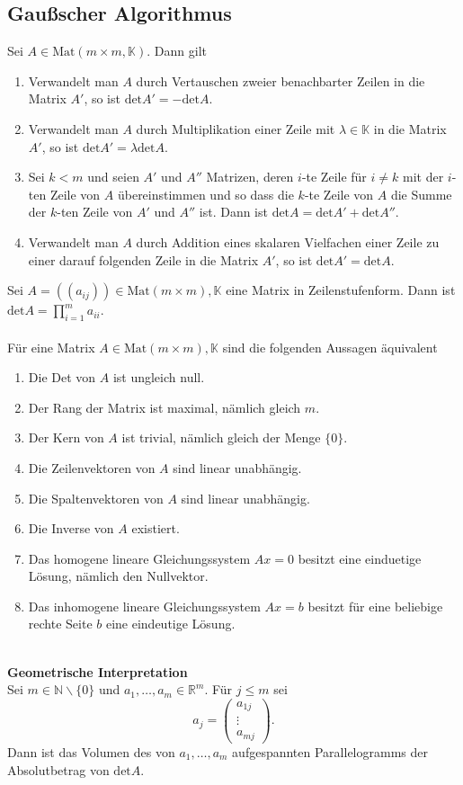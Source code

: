 \documentclass[a4paper,12pt]{article}
\numberwithin{equation}{section}
\begin{document}
\subsection{Gaußscher Algorithmus}
Sei $A \in \text{Mat}\left(m\times m,\mathbb{K}\right)$. Dann gilt
\begin{enumerate}[label=(\alph*)]
        \item Verwandelt man $A$ durch Vertauschen zweier benachbarter Zeilen in die Matrix $A'$, so ist $\text{det}A'=-\text{det}A$. 
        \item Verwandelt man $A$ durch Multiplikation einer Zeile mit $\lambda  \in \mathbb{K}$ in die Matrix $A'$, so ist $\text{det}A'=\lambda \text{det}A$.
        \item Sei $k<m$ und seien $A'$ und $A''$ Matrizen, deren $i$-te Zeile für $i \neq k$ mit der $i$-ten Zeile von $A$ übereinstimmen und so dass die $k$-te Zeile von $A$ die Summe der $k$-ten Zeile von $A'$ und $A''$ ist. Dann ist $\text{det}A=\text{det}A'+\text{det}A''$.
        \item Verwandelt man $A$ durch Addition eines skalaren Vielfachen einer Zeile zu einer darauf folgenden Zeile in die Matrix $A'$, so ist $\text{det}A'=\text{det}A$.
\end{enumerate}
Sei $A=\left(\left(a_{ij}\right)\right) \in \text{Mat}\left(m\times m\right),\mathbb{K}$ eine Matrix in Zeilenstufenform. Dann ist $\text{det}A=\prod_{i=1}^{m}a_{ii}$.\\\\
Für eine Matrix $A \in \text{Mat}\left(m\times m\right),\mathbb{K}$ sind die folgenden Aussagen äquivalent
\begin{enumerate}[label=(\alph*)]
        \item Die Det von $A$ ist ungleich null.
        \item Der Rang der Matrix ist maximal, nämlich gleich $m$.
        \item Der Kern von $A$ ist trivial, nämlich gleich der Menge $\{0\}$.
        \item Die Zeilenvektoren von $A$ sind linear unabhängig.
        \item Die Spaltenvektoren von $A$ sind linear unabhängig.
        \item Die Inverse von $A$ existiert.
        \item Das homogene lineare Gleichungssystem $Ax=0$ besitzt eine einduetige Lösung, nämlich den Nullvektor.
        \item Das inhomogene lineare Gleichungssystem $Ax=b$ besitzt für eine beliebige rechte Seite $b$ eine eindeutige Lösung.
\end{enumerate}
\hfill\\\textbf{Geometrische Interpretation}\\ 
Sei $m \in \mathbb{N}\backslash\{0\}$ und $a_1,\hdots ,a_m \in \mathbb{R}^m$. Für $j\leq m$ sei 
\[ 
        a_j=\left(\begin{matrix}
                a_{1j}\\\vdots \\a_{mj}
        \end{matrix}\right)
.\] 
Dann ist das Volumen des von $a_1,\hdots ,a_m$ aufgespannten Parallelogramms der Absolutbetrag von $\text{det}A$. 
\end{document}
